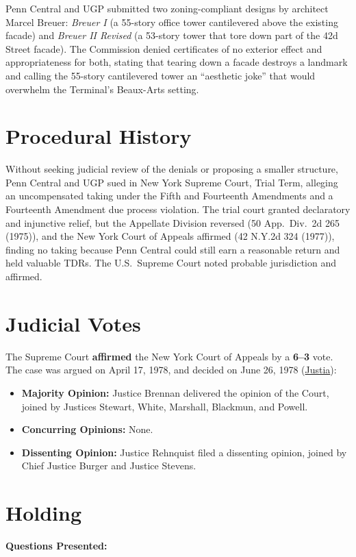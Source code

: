\documentclass[12pt]{article}
\begin{document}
Penn Central and UGP submitted two zoning-compliant designs by architect Marcel Breuer: \textit{Breuer I} (a 55-story office tower cantilevered above the existing facade) and \textit{Breuer II Revised} (a 53-story tower that tore down part of the 42d Street facade). The Commission denied certificates of no exterior effect and appropriateness for both, stating that tearing down a facade destroys a landmark and calling the 55-story cantilevered tower an ``aesthetic joke'' that would overwhelm the Terminal's Beaux-Arts setting.

\section{Procedural History}
Without seeking judicial review of the denials or proposing a smaller structure, Penn Central and UGP sued in New York Supreme Court, Trial Term, alleging an uncompensated taking under the Fifth and Fourteenth Amendments and a Fourteenth Amendment due process violation. The trial court granted declaratory and injunctive relief, but the Appellate Division reversed (50 App.\ Div.\ 2d 265 (1975)), and the New York Court of Appeals affirmed (42 N.Y.2d 324 (1977)), finding no taking because Penn Central could still earn a reasonable return and held valuable TDRs. The U.S.\ Supreme Court noted probable jurisdiction and affirmed.

\section{Judicial Votes}
The Supreme Court \textbf{affirmed} the New York Court of Appeals by a \textbf{6--3} vote. The case was argued on April 17, 1978, and decided on June 26, 1978 (\href{https://supreme.justia.com/cases/federal/us/438/104/}{Justia}):

\begin{itemize}
    \item \textbf{Majority Opinion:} Justice Brennan delivered the opinion of the Court, joined by Justices Stewart, White, Marshall, Blackmun, and Powell.
    \item \textbf{Concurring Opinions:} None.
    \item \textbf{Dissenting Opinion:} Justice Rehnquist filed a dissenting opinion, joined by Chief Justice Burger and Justice Stevens.
\end{itemize}

\section{Holding}
\textbf{Questions Presented:}
\end{document}
